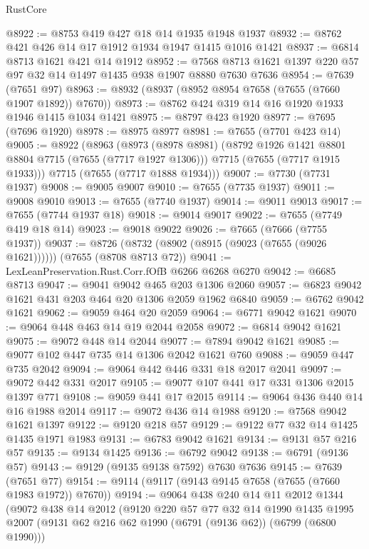 \begin{lexlean}{RustCore}
\begin{coremodule}
@8922 := @8753 @419 @427 @18 @14 @1935 @1948 @1937
@8932 := @8762 @421 @426 @14 @17 @1912 @1934 @1947 @1415 @1016 @1421
@8937 := @6814 @8713 @1621 @421 @14 @1912
@8952 := @7568 @8713 @1621 @1397 @220 @57 @97 @32 @14 @1497 @1435 @938 @1907 @8880 @7630 @7636
@8954 := @7639 (@7651 @97)
@8963 := @8932 (@8937 (@8952 @8954 @7658 (@7655 (@7660 @1907 @1892)) @7670))
@8973 := @8762 @424 @319 @14 @16 @1920 @1933 @1946 @1415 @1034 @1421
@8975 := @8797 @423 @1920
@8977 := @7695 (@7696 @1920)
@8978 := @8975 @8977
@8981 := @7655 (@7701 @423 @14)
@9005 := @8922
    (@8963
      (@8973
        (@8978 @8981)
        (@8792 @1926 @1421 @8801 @8804 @7715 (@7655 (@7717 @1927 @1306)))
        @7715
        (@7655 (@7717 @1915 @1933)))
      @7715
      (@7655 (@7717 @1888 @1934)))
@9007 := @7730 (@7731 @1937)
@9008 := @9005 @9007
@9010 := @7655 (@7735 @1937)
@9011 := @9008 @9010
@9013 := @7655 (@7740 @1937)
@9014 := @9011 @9013
@9017 := @7655 (@7744 @1937 @18)
@9018 := @9014 @9017
@9022 := @7655 (@7749 @419 @18 @14)
@9023 := @9018 @9022
@9026 := @7665 (@7666 (@7755 @1937))
@9037 := @8726 (@8732 (@8902 (@8915 (@9023 (@7655 (@9026 @1621)))))) (@7655 (@8708 @8713 @72))
@9041 := LexLeanPreservation.Rust.Corr.fOfB @6266 @6268 @6270
@9042 := @6685 @8713
@9047 := @9041 @9042 @465 @203 @1306 @2060
@9057 := @6823 @9042 @1621 @431 @203 @464 @20 @1306 @2059 @1962 @6840
@9059 := @6762 @9042 @1621
@9062 := @9059 @464 @20 @2059
@9064 := @6771 @9042 @1621
@9070 := @9064 @448 @463 @14 @19 @2044 @2058
@9072 := @6814 @9042 @1621
@9075 := @9072 @448 @14 @2044
@9077 := @7894 @9042 @1621
@9085 := @9077 @102 @447 @735 @14 @1306 @2042 @1621 @760
@9088 := @9059 @447 @735 @2042
@9094 := @9064 @442 @446 @331 @18 @2017 @2041
@9097 := @9072 @442 @331 @2017
@9105 := @9077 @107 @441 @17 @331 @1306 @2015 @1397 @771
@9108 := @9059 @441 @17 @2015
@9114 := @9064 @436 @440 @14 @16 @1988 @2014
@9117 := @9072 @436 @14 @1988
@9120 := @7568 @9042 @1621 @1397
@9122 := @9120 @218 @57
@9129 := @9122 @77 @32 @14 @1425 @1435 @1971 @1983
@9131 := @6783 @9042 @1621
@9134 := @9131 @57 @216 @57
@9135 := @9134 @1425
@9136 := @6792 @9042
@9138 := @6791 (@9136 @57)
@9143 := @9129 (@9135 @9138 @7592) @7630 @7636
@9145 := @7639 (@7651 @77)
@9154 := @9114 (@9117 (@9143 @9145 @7658 (@7655 (@7660 @1983 @1972)) @7670))
@9194 := @9064
    @438
    @240
    @14
    @11
    @2012
    @1344
    (@9072
      @438
      @14
      @2012
      (@9120
        @220
        @57
        @77
        @32
        @14
        @1990
        @1435
        @1995
        @2007
        (@9131 @62 @216 @62 @1990 (@6791 (@9136 @62)) (@6799 (@6800 @1990)))

\end{coremodule}
\end{lexlean}
